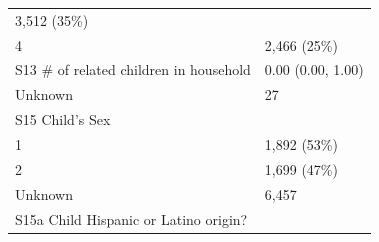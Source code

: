 \documentclass[]{article}
\begin{document}
\begin{longtable}[]{@{}ll@{}}
\begin{minipage}[t]{0.23\columnwidth}
3,512 (35\%)\strut
\end{minipage}\tabularnewline
\begin{minipage}[t]{0.71\columnwidth}\raggedright
4\strut
\end{minipage} & \begin{minipage}[t]{0.23\columnwidth}\raggedright
2,466 (25\%)\strut
\end{minipage}\tabularnewline
\begin{minipage}[t]{0.71\columnwidth}\raggedright
S13 \# of related children in household\strut
\end{minipage} & \begin{minipage}[t]{0.23\columnwidth}\raggedright
0.00 (0.00, 1.00)\strut
\end{minipage}\tabularnewline
\begin{minipage}[t]{0.71\columnwidth}\raggedright
Unknown\strut
\end{minipage} & \begin{minipage}[t]{0.23\columnwidth}\raggedright
27\strut
\end{minipage}\tabularnewline
\begin{minipage}[t]{0.71\columnwidth}\raggedright
S15 Child's Sex\strut
\end{minipage} & \begin{minipage}[t]{0.23\columnwidth}\raggedright
\strut
\end{minipage}\tabularnewline
\begin{minipage}[t]{0.71\columnwidth}\raggedright
1\strut
\end{minipage} & \begin{minipage}[t]{0.23\columnwidth}\raggedright
1,892 (53\%)\strut
\end{minipage}\tabularnewline
\begin{minipage}[t]{0.71\columnwidth}\raggedright
2\strut
\end{minipage} & \begin{minipage}[t]{0.23\columnwidth}\raggedright
1,699 (47\%)\strut
\end{minipage}\tabularnewline
\begin{minipage}[t]{0.71\columnwidth}\raggedright
Unknown\strut
\end{minipage} & \begin{minipage}[t]{0.23\columnwidth}\raggedright
6,457\strut
\end{minipage}\tabularnewline
\begin{minipage}[t]{0.71\columnwidth}\raggedright
S15a Child Hispanic or Latino origin?\strut

\end{minipage}
\end{longtable}
\end{document}
